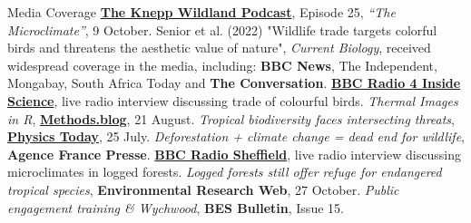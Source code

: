 \begin{rubric}{Media Coverage}
\entry*[2023] \textbf{\href{https://knepp.co.uk/2023/10/installing-data-loggers/}{The Knepp Wildland Podcast}}, Episode 25, \emph{``The Microclimate''}, 9 October.
\entry*[2022] Senior et al. (2022) "Wildlife trade targets colorful birds and threatens the aesthetic value of nature", \emph{Current Biology}, received widespread coverage in the media, including: \textbf{BBC News}, The Independent, Mongabay, South Africa Today and \textbf{The Conversation}.
\entry*[2022] \textbf{\href{https://www.bbc.co.uk/programmes/m001bz82}{BBC Radio 4 Inside Science}}, live radio interview discussing trade of colourful birds. 
\entry*[2019] \emph{Thermal Images in R}, \textbf{\href{https://methodsblog.com/2019/08/21/thermal-images-r/}{Methods.blog}}, 21 August. 
\entry*[2019] \emph{Tropical biodiversity faces intersecting threats}, \textbf{\href{https://physicstoday.scitation.org/do/10.1063/PT.6.1.20190725a/full/}{Physics Today}}, 25 July. 
\entry*[2019] \emph{Deforestation + climate change = dead end for wildlife}, \textbf{Agence France Presse}. 
\entry*[2017] \textbf{\href{https://acce.shef.ac.uk/good-news-for-a-change-acce-student-rebecca-seniors-interview-for-bbc/}{BBC Radio Sheffield}}, live radio interview discussing microclimates in logged forests. 
\entry*[2017] \emph{Logged forests still offer refuge for endangered tropical species}, \textbf{Environmental Research Web}, 27 October.
\entry*[2016] \emph{Public engagement training \& Wychwood}, \textbf{BES Bulletin}, Issue 15.
\end{rubric}